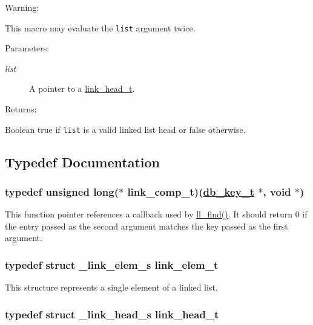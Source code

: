 \begin{Desc}
\item[Warning: ]\par
This macro may evaluate the {\tt list} argument twice.\end{Desc}
\begin{Desc}
\item[Parameters: ]\par
\begin{description}
\item[{\em 
list}]A pointer to a \hyperlink{group__dbprim__link_a0}{link\_\-head\_\-t}.\end{description}
\end{Desc}
\begin{Desc}
\item[Returns: ]\par
Boolean true if {\tt list} is a valid linked list head or false otherwise. \end{Desc}


\subsection{Typedef Documentation}
\hypertarget{group__dbprim__link_a3}{
\subsubsection[link\_\-comp\_\-t]{\setlength{\rightskip}{0pt plus 5cm}typedef unsigned long($\ast$ link\_\-comp\_\-t)(\hyperlink{group__dbprim_a0}{db\_\-key\_\-t} $\ast$, void $\ast$)}}
\label{group__dbprim__link_a3}


This function pointer references a callback used by \hyperlink{group__dbprim__link_a9}{ll\_\-find()}. It should return 0 if the entry passed as the second argument matches the key passed as the first argument. \hypertarget{group__dbprim__link_a1}{
\subsubsection[link\_\-elem\_\-t]{\setlength{\rightskip}{0pt plus 5cm}typedef struct \_\-link\_\-elem\_\-s link\_\-elem\_\-t}}
\label{group__dbprim__link_a1}


This structure represents a single element of a linked list. \hypertarget{group__dbprim__link_a0}{
\subsubsection[link\_\-head\_\-t]{\setlength{\rightskip}{0pt plus 5cm}typedef struct \_\-link\_\-head\_\-s link\_\-head\_\-t}}
\label{group__dbprim__link_a0}



